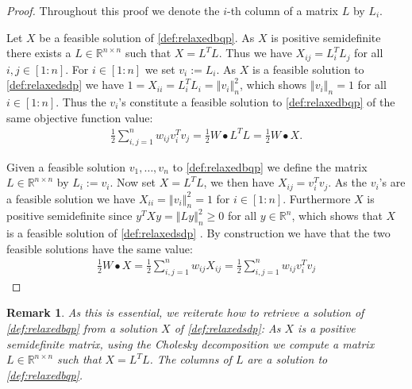 \documentclass[12pt,a4paper]{article}
\theoremstyle{mythm}
\newtheorem*{rem}{Remark}
\begin{document}
\begin{proof}
Throughout this proof we denote the $ i $-th column of a matrix $ L $ by $ L_i $. 

Let $ X $ be a feasible solution of \ref{def:relaxedbqp}. 
As $ X $ is positive semidefinite there exists a $ L \in \mathbb{R} ^{ n \times n }  $ such that $ X = L ^T L $. 
Thus we have $ X _{ ij } = L_i ^T L_j $ for all $ i,j \in \left[ 1:n \right]  $.
For $ i \in \left[ 1:n \right] $ we set $ v_i := L_i $.
As $ X $ is a feasible solution to \ref{def:relaxedsdp} we have $ 1 = X _{ ii } = L_i ^T L_i = \left\Vert v_i \right\Vert ^{ 2 } _{ n } $, which shows $ \left\Vert v_i
\right\Vert _{ n } = 1 $ for all $ i \in \left[ 1:n \right]  $. Thus the $ v_i $'s constitute a feasible solution to \ref{def:relaxedbqp} of the same objective function value:
\begin{align*}
\frac{ 1 }{ 2 } \sum_{ i,j = 1 }^{ n } w _{ ij } v_i ^T v_j = \frac{ 1 }{ 2 } W \bullet L^T L = \frac{ 1 }{ 2 } W \bullet X.
\end{align*} 

Given a feasible solution $ v_1 , \dots , v_n $	to \ref{def:relaxedbqp} we define the matrix $ L \in \mathbb{R} ^{ n \times n } $ by $ L_i := v_i $. 
Now set $ X = L^T L $, we then have $ X _{ ij } = v_i ^T v_j $. 
As the $ v_i $'s are a feasible solution we have $ X _{ ii } = \left\Vert v_i \right\Vert ^{ 2 } _{ n } =1 $ for $ i \in \left[ 1:n \right]  $.
Furthermore $ X $ is positive semidefinite since $ y^T X y = \left\Vert Ly \right\Vert ^{ 2 } _{ n } \geq 0  $ for all $ y \in \mathbb{R} ^{ n }  $, which shows that $ X $ is
a feasible solution of \ref{def:relaxedsdp} .
By construction we have that the two feasible solutions have the same value:
\begin{align*}
\frac{ 1 }{ 2 } W \bullet X = \frac{ 1 }{ 2 } \sum_{ i,j = 1 }^{ n } w _{ ij } X _{ ij } = \frac{ 1 }{ 2 } \sum_{ i,j = 1 }^{ n } w _{ ij } v_i ^T v_j
\end{align*} 
\end{proof}
\begin{rem}
As this is essential, we reiterate how to retrieve a solution of \ref{def:relaxedbqp} from a solution $ X $ of \ref{def:relaxedsdp}:
As $ X $ is a positive semidefinite matrix, using the Cholesky decomposition we compute a matrix $ L \in \mathbb{R} ^{ n \times n }  $ such that $ X = L^T L $. The columns of $
L $ are a solution to \ref{def:relaxedbqp}.
\end{rem} 
\end{document}
